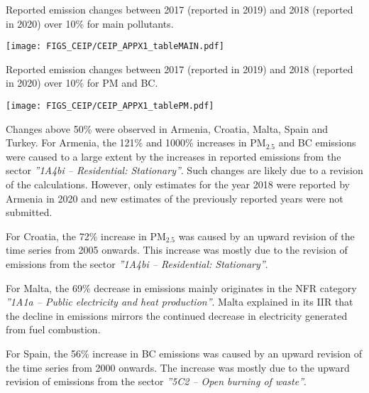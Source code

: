 \begin{table} 
  \caption[Emission changes (main pollutants)]{Reported emission changes between 2017 (reported in 2019) and 2018 (reported in 2020) over 10\% for main pollutants.}
\centering
{\texttt{[image: FIGS\_CEIP/CEIP\_APPX1\_tableMAIN.pdf]}}
\label{tab:emisdiffMAIN}  
\end{table}

\begin{table} 
  \caption[Emission changes (PM)]{Reported emission changes between 2017 (reported in 2019) and 2018 (reported in 2020) over 10\% for PM and BC.}
\centering
{\texttt{[image: FIGS\_CEIP/CEIP\_APPX1\_tablePM.pdf]}}
\label{tab:emisdiffPM}  
\end{table}

Changes above 50\% were observed in Armenia, Croatia, Malta, Spain and Turkey. For Armenia, the 121\% and 1000\% increases in PM$_{2.5}$ and BC emissions were caused to a large extent by the increases in reported emissions from the sector {\it ''1A4bi -- Residential: Stationary''}. Such changes are likely  due to a revision of the calculations. However, only estimates for the year 2018 were reported by Armenia in 2020 and new estimates of the previously reported years were not submitted.

For Croatia, the 72\% increase in PM$_{2.5}$ was caused by an upward revision of the time series from 2005 onwards. This increase was mostly due  to the revision of emissions from the sector {\it ''1A4bi -- Residential: Stationary''}.

For Malta, the 69\% decrease in \sox emissions mainly originates in the NFR category {\it ''1A1a -- Public electricity and heat production''}. Malta explained in its IIR that the decline in \sox emissions mirrors the continued decrease in electricity generated from fuel combustion.

For Spain, the 56\% increase in BC emissions was caused by an upward revision of the time series from 2000 onwards. The increase was mostly due to the upward revision of emissions from the sector {\it ''5C2 -- Open burning of waste''}.



